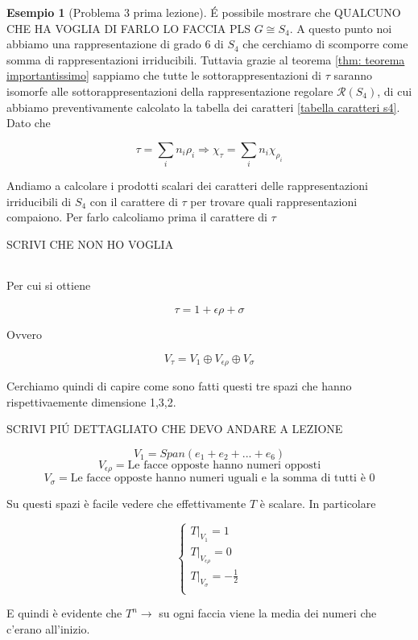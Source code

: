 \documentclass[11pt]{article}
\theoremstyle{plain}
\theoremstyle{definition}
\newtheorem{exmp}{Esempio}[section]
\theoremstyle{remark}
\newcommand{\dsum}{\displaystyle\sum}
\begin{document}
\begin{exmp}[Problema 3 prima lezione]
\'E possibile mostrare che QUALCUNO CHE HA VOGLIA DI FARLO LO FACCIA PLS $G \cong S_4$. A questo punto noi abbiamo una rappresentazione di grado 6 di $S_4$ che cerchiamo di scomporre come somma di rappresentazioni irriducibili. Tuttavia grazie al teorema \ref{thm: teorema importantissimo} sappiamo che tutte le sottorappresentazioni di $\tau$ saranno isomorfe alle sottorappresentazioni della rappresentazione regolare $\mathcal{R}(S_4)$, di cui abbiamo preventivamente calcolato la tabella dei caratteri \ref{tabella caratteri s4}. Dato che


\[\tau = \dsum_i n_i\rho_i \Rightarrow \chi_\tau  = \dsum_i n_i\chi_{\rho_i}\]

Andiamo a calcolare i prodotti scalari dei caratteri delle rappresentazioni irriducibili di $S_4$ con il carattere di $\tau$ per trovare quali rappresentazioni compaiono. Per farlo calcoliamo prima il carattere di $\tau$


SCRIVI CHE NON HO VOGLIA

\begin{table}[!ht]
\centering
\begin{tabular}{|c|c|c|c|c|c|}
\hline


\end{tabular}
\end{table}



Per cui si ottiene

\[\tau = 1 + \epsilon\rho + \sigma \]

Ovvero

\[V_\tau = V_1 \oplus V_{\epsilon\rho} \oplus V_{\sigma} \]


Cerchiamo quindi di capire come sono fatti questi tre spazi che hanno rispettivaemente dimensione 1,3,2.


SCRIVI PI\'U DETTAGLIATO CHE DEVO ANDARE A LEZIONE

\[V_1 =  Span(e_1 + e_2 + ... + e_6) \]
\[V_{\epsilon\rho} = \text{Le facce opposte hanno numeri opposti}\]
\[V_{\sigma} = \text{Le facce opposte hanno numeri uguali e la somma di tutti è 0}\]

Su questi spazi è facile vedere che effettivamente $T$ è scalare. In particolare

\[
\begin{cases}
T|_{V_1} = 1 \\
T|_{V_{\epsilon\rho}} = 0 \\
T|_{V_\sigma} = -\frac{1}{2}\\
\end{cases}
\]

E quindi è evidente che $T^n \to $ su ogni faccia viene la media dei numeri che c'erano all'inizio.


\end{exmp}
\end{document}
